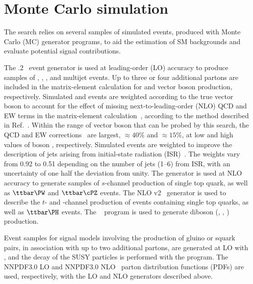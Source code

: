 \section{Monte Carlo simulation}
\label{sec:simulation}

The search relies on several samples of simulated events, produced
with Monte Carlo (MC) generator programs, to aid the estimation of SM
backgrounds and evaluate potential signal contributions.

The .2~\cite{Alwall2014} event generator is used at
leading-order (LO) accuracy to produce samples of \wj, \zj, \ttbar,
and multijet events. Up to three or four additional partons are
included in the matrix-element calculation for \ttbar and vector boson
production, respectively. Simulated \wj and \zj events are weighted
according to the true vector boson \pt to account for the effect of
missing next-to-leading-order (NLO) QCD and EW terms in the
matrix-element calculation~\cite{Alwall2014, Kuhn:2005gv}, according
to the method described in Ref.~\cite{Khachatryan:2016mdm}. Within the
range of vector boson \pt that can be probed by this search, the QCD
and EW corrections~\cite{Kuhn:2005gv} are largest, ${\approx}40\%$ and
${\approx}15\%$, at low and high values of boson \pt,
respectively. Simulated \ttbar events are weighted to improve the
description of jets arising from initial-state radiation
(ISR)~\cite{Chatrchyan:2013xna}. The weights vary from 0.92 to 0.51
depending on the number of jets (1--6) from ISR, with an uncertainty
of one half the deviation from unity. The \MGvATNLO generator is used
at NLO accuracy to generate samples of $s$-channel production of
single top quark, as well as $\ttbar\PW$ and $\ttbar\cPZ$ events. The
NLO \POWHEG v2~\cite{powheg, powheg_top_Wt} generator is used to
describe the $t$- and \PW\cPqt-channel production of events containing
single top quarks, as well as $\ttbar\PH$ events. The ~\cite{pythia} program is used to generate diboson (\PW\PW,
\PW\cPZ, \cPZ\cPZ) production.

Event samples for signal models involving the production of gluino or
squark pairs, in association with up to two additional partons, are
generated at LO with \MGvATNLO, and the decay of the SUSY particles is
performed with the \PYTHIA program. The {NNPDF}3.0 LO and
{NNPDF}3.0 NLO~\cite{nnpdf} parton distribution functions
(PDFs) are used, respectively, with the LO and NLO generators
described above.

